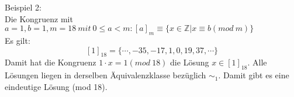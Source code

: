 \documentclass[11pt,a4paper]{article}
\begin{document}
Beispiel 2: \\
Die Kongruenz mit $a=1, b=1, m=18 ~mit~ 0\leq a < m: [a]_m \equiv \{x \in \mathbb{Z}| x\equiv b(mod~m)\}$\\
Es gilt:\\
\[[1]_{18} = \{\cdots, -35, -17,1,0,19, 37,\cdots \}\]
Damit hat die Kongruenz  $1\cdot x=1(mod~18)$ die Lösung $x \in [1]_{18}.$ Alle Lösungen liegen in derselben Äquivalenzklasse bezüglich $\sim_1$. Damit gibt es eine eindeutige Lösung (mod 18).\\
\end{document}
